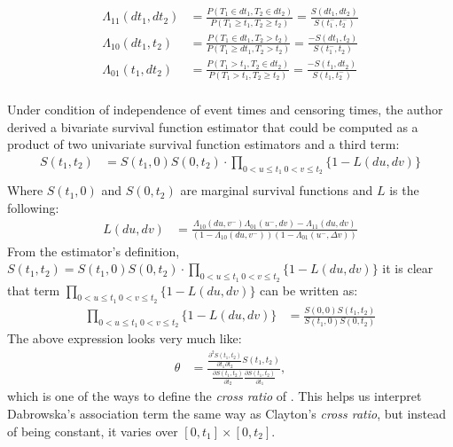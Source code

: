 \documentclass[]{article}
\begin{document}
	$$
	\begin{aligned}
		\Lambda_{11}(dt_1,dt_2) &= \frac{P(T_1 \in dt_1, T_2\in dt_2)}{P(T_1 \geq t_1, T_2 \geq t_2)} = \frac{S(dt_1, dt_2)}{S(t_1^-, t_2^-)}\\
		\Lambda_{10}(dt_1,t_2) &= \frac{P(T_1 \in dt_1, T_2 > t_2)}{P(T_1 \geq dt_1, T_2 > t_2)} = \frac{-S(dt_1, t_2)}{S(t_1^-, t_2)}\\ %
		\Lambda_{01}(t_1,dt_2) &= \frac{P(T_1 > t_1, T_2\in dt_2)}{P(T_1 > t_1, T_2 \geq t_2)} = \frac{-S(t_1, dt_2)}{S(t_1, t_2^-)}\\
	\end{aligned}
	$$


Under condition of independence of event times and censoring times, the author derived a bivariate survival function estimator that could be computed as a product of two univariate survival function estimators and a third term:
	$$
	\begin{aligned}
		{S}(t_1,t_2) &= {S}(t_1,0){S}(0,t_2)\cdot \prod_{{0<u\leq t_1~0<v\leq t_2}}\{1 - {L}(d u, d v)\}\\
	\end{aligned}
	$$
Where $S(t_1,0)$ and $S(0,t_2)$ are marginal survival functions and $L$ is the following:
	$$
	\begin{aligned}
		L(du, dv) &= \frac{{\Lambda}_{10}(d u,v^-){\Lambda}_{01}(u^-,d v) - {\Lambda}_{11}(du, dv)}{\left(1-{\Lambda}_{10}(d u,v^-)\right)\left(1-{\Lambda}_{01}(u^-,\Delta v)\right)}
	\end{aligned}
	$$
From the estimator's definition, ${S}(t_1,t_2) = {S}(t_1,0){S}(0,t_2)\cdot \prod_{{0<u\leq t_1~0<v\leq t_2}}\{1 - {L}(d u, d v)\}$ it is clear that term $\prod_{{0<u\leq t_1~0<v\leq t_2}}\{1 - {L}(d u, d v)\}$ can be written as:
	$$
	\begin{aligned}
		\prod_{{0<u\leq t_1~0<v\leq t_2}}\{1 - {L}(d u, d v)\} &=
		\frac{S(0,0)  S(t_1,t_2)}{ S(t_1,0)S(0,t_2) }
	\end{aligned}
	$$
The above expression looks very much like:
	$$
	\begin{aligned}
		\theta &= \frac{ \frac{\partial^2 S(t_1,t_2)}{\partial t_1 \partial t_2} S(t_1, t_2)}    {\frac{\partial S(t_1, t_2)}{\partial t_2} \frac{\partial S(t_1, t_2)}{\partial t_1}},
	\end{aligned}
	$$
which is one of the ways to define the \emph{cross ratio} of \cite{clayton1978model}. This helps us interpret Dabrowska's association term the same way as Clayton's \emph{cross ratio}, but instead of being constant, it varies over $[0, t_1]\times [0, t_2]$.\\
\end{document}
